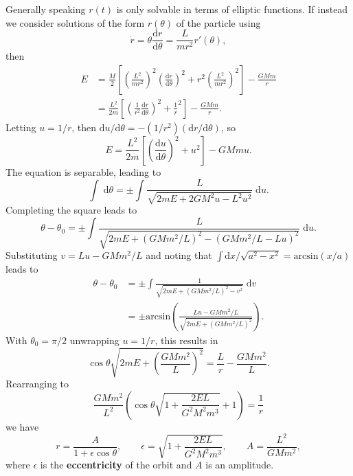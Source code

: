 \documentclass[letter-paper]{tufte-book}
\newcommand\Def[1]{\textbf{#1}}
\begin{document}
Generally speaking $r(t)$ is only solvable in terms of elliptic functions. If
instead we consider solutions of the form $r(\theta)$ of the particle using
\begin{equation*}
  \dot{r} = \dot{\theta} \frac{\mathrm{d}r}{\mathrm{d}\theta} = \frac{L}{mr^2} r'(\theta),
\end{equation*}
then
\begin{align*}
  E &= \frac{M}{2}\left[\left(\frac{L^2}{mr^2}\right)^2 \left(\frac{\mathrm{d}r}{\mathrm{d}\theta}\right)^2 + r^2 \left(\frac{L^2}{mr^2}\right)^2\right] - \frac{GMm}{r}\\
  &= \frac{L^2}{2m}\left[\left(\frac{1}{r^2}\frac{\mathrm{d}r}{\mathrm{d}\theta}\right)^2 + \frac{1}{r}^2\right] - \frac{GMm}{r}.
\end{align*}
Letting $u = 1/r$, then $\mathrm{d}u/\mathrm{d}\theta = -(1/r^2)
(\mathrm{d}r/\mathrm{d}\theta)$, so
\begin{equation*}
  E = \frac{L^2}{2m} \left[\left(\frac{\mathrm{d}u}{\mathrm{d}\theta}\right)^2 +
  u^2\right] - GMmu.
\end{equation*}
The equation is separable, leading to
\begin{equation*}
  \int\; \mathrm{d}\theta = \pm \int \frac{L}{\sqrt{2mE + 2GM^2u - L^2 u^2}}\; \mathrm{d}u.
\end{equation*}
Completing the square leads to
\begin{equation*}
  \theta - \theta_0 = \pm \int \frac{L}{\sqrt{2mE + (GMm^2 / L)^2 - (GMm^2 / L - L u)^2}}\; \mathrm{d}u.
\end{equation*}
Substituting $v = Lu - GMm^2 / L$ and noting that $\int\mathrm{d}x /
\sqrt{a^2 - x^2} = \mathrm{arcsin}(x/a)$ leads to
\begin{align*}
  \theta - \theta_0 &= \pm \int \frac{1}{\sqrt{2mE + (GMm^2 / L)^2 - v^2}}\; \mathrm{d}v\\
  &= \pm \mathrm{arcsin}\left(\frac{Lu - GMm^2 / L}{\sqrt{2mE + (GMm^2 / L)^2}}\right).
\end{align*}
With $\theta_0 = \pi / 2$ unwrapping $u = 1/r$, this results in
\begin{equation*}
  \cos\theta \sqrt{2mE + \left(\frac{GMm^2}{L}\right)^2} = \frac{L}{r} -
  \frac{GMm^2}{L}.
\end{equation*}
Rearranging to
\begin{equation*}
  \frac{GMm^2}{L^2}\left(\cos\theta\sqrt{1 + \frac{2EL}{G^2M^2m^3}} + 1\right) = \frac{1}{r}
\end{equation*}
we have
\begin{equation*}
  r = \frac{A}{1 + \epsilon \cos \theta}, \qquad \epsilon = \sqrt{1 + \frac{2EL}{G^2M^2m^3}}, \qquad A = \frac{L^2}{GMm^2},
\end{equation*}
where $\epsilon$ is the \Def{eccentricity} of the orbit and $A$ is an
amplitude.
\end{document}
